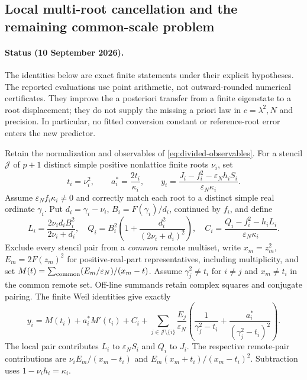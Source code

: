 \subsection{Local multi-root cancellation and the remaining common-scale problem}
\label{ssec:multiroot-filter}

\paragraph{Status (10 September 2026).}
The identities below are exact finite statements under their explicit hypotheses.
The reported evaluations use point arithmetic, not outward-rounded numerical
certificates. They improve the a posteriori transfer from a finite eigenstate
to a root displacement; they do not supply the missing a priori law in
$c=\lambda^2,N$ and precision. In particular, no fitted conversion constant or
reference-root error enters the new predictor.

Retain the normalization and observables of
\eqref{eq:divided-observables}. For a stencil $\mathcal J$ of $p+1$ distinct
simple positive nonlattice finite roots $\nu_i$, set
\[
 t_i=\nu_i^2,\qquad a_i^*=\frac{2t_i}{\kappa_i},\qquad
 y_i=\frac{J_i-f_i^2-\varepsilon_N h_iS_i}
                {\varepsilon_N\kappa_i}.
\]
Assume $\varepsilon_N f_i\kappa_i\ne0$ and correctly match each root to a
distinct simple real ordinate $\gamma_i$. Put $d_i=\gamma_i-\nu_i$,
$B_i=F(\gamma_i)/d_i$, continued by $f_i$, and define
\[
 L_i=\frac{2\nu_i d_i B_i^2}{2\nu_i+d_i},\quad
 Q_i=B_i^2\left(1+\frac{d_i^2}{(2\nu_i+d_i)^2}\right),\quad
 C_i=\frac{Q_i-f_i^2-h_iL_i}{\varepsilon_N\kappa_i}.
\]
Exclude every stencil pair from a \emph{common} remote multiset, write
$x_m=z_m^2$, $E_m=2F(z_m)^2$ for positive-real-part representatives, including
multiplicity, and set $M(t)=\sum_{\rm common}(E_m/\varepsilon_N)/(x_m-t)$.
Assume $\gamma_j^2\ne t_i$ for $i\ne j$ and $x_m\ne t_i$ in the common
remote set. Off-line summands retain complex squares and conjugate pairing.
The finite Weil identities give exactly
\begin{equation}\label{eq:multiroot-robin}
 y_i=M(t_i)+a_i^*M'(t_i)+C_i+
 \sum_{j\in\mathcal J\setminus\{i\}}\frac{E_j}{\varepsilon_N}
 \left(\frac1{\gamma_j^2-t_i}+\frac{a_i^*}{(\gamma_j^2-t_i)^2}\right).
\end{equation}
The local pair contributes $L_i$ to $\varepsilon_NS_i$ and $Q_i$ to $J_i$.
The respective remote-pair contributions are
$\nu_i E_m/(x_m-t_i)$ and $E_m(x_m+t_i)/(x_m-t_i)^2$.
Subtraction uses $1-\nu_i h_i=\kappa_i$.

